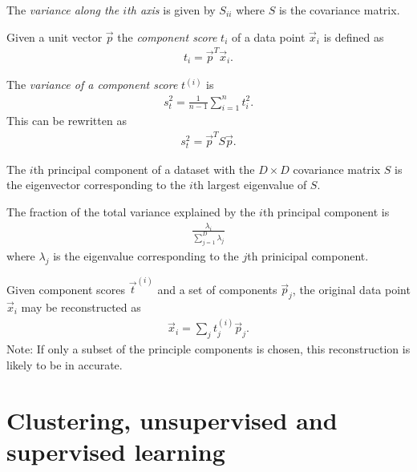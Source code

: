 \documentclass{article}
\begin{document}
\begin{definition}
	The \emph{variance along the $i$th axis} is given by $S_{ii}$ where $S$ is the
	covariance matrix.
\end{definition}
\begin{definition}
	Given a unit vector $\vec p$ the \emph{component score} $t_i$ of a data point
	$\vec x_i$ is defined as
	\begin{align*}
		t_i = {\vec p}^{T} \vec x_i.
	\end{align*}
\end{definition}
\begin{definition}
	The \emph{variance of a component score} $t^{(i)}$ is
	\begin{align*}
		s_t^2 = \frac{1}{n-1}\sum_{i=1}^n t_i^2.
	\end{align*}
	This can be rewritten as
	\begin{align*}
		s^2_t = \vec p^T S\vec p.
	\end{align*}
\end{definition}
\begin{theorem}
	The $i$th principal component of a dataset with the $D\times D$ covariance
	matrix $S$ is the eigenvector corresponding to the $i$th largest eigenvalue
	of $S$.
\end{theorem}
\begin{proposition}
	The fraction of the total variance explained by the $i$th principal component
	is
	\begin{align*}
		\frac{\lambda_i}{\sum_{j=1}^D \lambda_j}
	\end{align*}
	where $\lambda_j$ is the eigenvalue corresponding to the $j$th prinicipal
	component.
\end{proposition}

\begin{theorem}
	Given component scores $\vec t^{(i)}$ and a set of components $\vec p_j$,
	the original data point $\vec x_i$ may be reconstructed as
	\begin{align*}
		\vec x_i = \sum_j t^{(i)}_j \vec p_j.
	\end{align*}
	Note: If only a subset of the principle components is chosen, this
	reconstruction is likely to be in accurate.
\end{theorem}


\section{Clustering, unsupervised and supervised learning}
\end{document}
